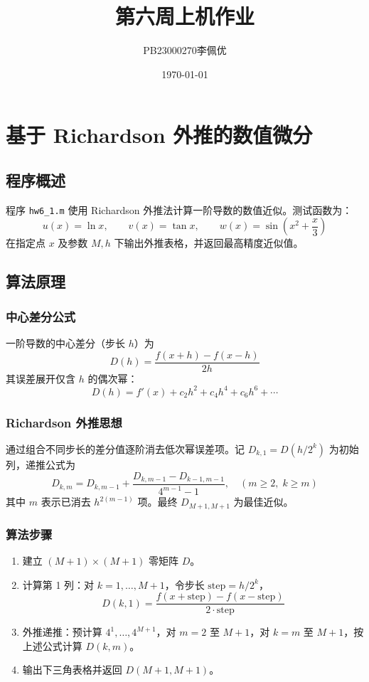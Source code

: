 \documentclass[12pt,a4paper]{article}
\title{第六周上机作业}
\author{PB23000270李佩优}
\date{\today}
\begin{document}
\maketitle

\section{基于 Richardson 外推的数值微分}

\subsection{程序概述}

程序 \texttt{hw6\_1.m} 使用 Richardson 外推法计算一阶导数的数值近似。测试函数为：
\[
u(x)=\ln x,\qquad v(x)=\tan x,\qquad w(x)=\sin\left(x^2+\frac{x}{3}\right)
\]
在指定点 \(x\) 及参数 \(M, h\) 下输出外推表格，并返回最高精度近似值。

\subsection{算法原理}

\subsubsection{中心差分公式}
一阶导数的中心差分（步长 \(h\)）为
\[
D(h)=\frac{f(x+h)-f(x-h)}{2h}
\]
其误差展开仅含 \(h\) 的偶次幂：
\[
D(h)=f'(x)+c_2h^2+c_4h^4+c_6h^6+\cdots
\]

\subsubsection{Richardson 外推思想}
通过组合不同步长的差分值逐阶消去低次幂误差项。记 \(D_{k,1}=D(h/2^k)\) 为初始列，递推公式为
\[
D_{k,m}=D_{k,m-1}+\frac{D_{k,m-1}-D_{k-1,m-1}}{4^{m-1}-1},\quad (m\ge 2,\; k\ge m)
\]
其中 \(m\) 表示已消去 \(h^{2(m-1)}\) 项。最终 \(D_{M+1,M+1}\) 为最佳近似。

\subsubsection{算法步骤}
\begin{enumerate}
    \item 建立 \((M+1)\times(M+1)\) 零矩阵 \(D\)。
    \item 计算第 1 列：对 \(k=1,\dots,M+1\)，令步长 \(\text{step}=h/2^{k}\)，
    \[
    D(k,1)=\frac{f(x+\text{step})-f(x-\text{step})}{2\cdot\text{step}}
    \]
    \item 外推递推：预计算 \(4^{1},\dots,4^{M+1}\)，对 \(m=2\) 至 \(M+1\)，对 \(k=m\) 至 \(M+1\)，按上述公式计算 \(D(k,m)\)。
    \item 输出下三角表格并返回 \(D(M+1,M+1)\)。
\end{enumerate}
\end{document}

